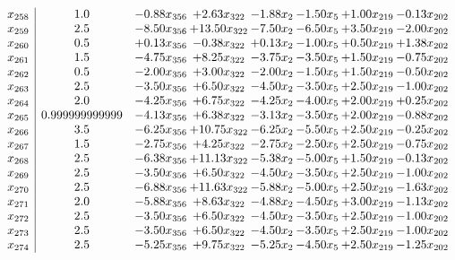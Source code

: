 \documentclass[8pt]{article}
\begin{document}
\[\begin{array}{c| c c@{\hskip 2pt} c@{\hskip 2pt} c@{\hskip 2pt} c@{\hskip 2pt} c@{\hskip 2pt} c@{\hskip 2pt} }
 x_{258}   &  1.0 & -0.88 x_{356} & +  2.63 x_{322} & -1.88 x_{2} & -1.50 x_{5} & +  1.00 x_{219} & -0.13 x_{202}\\
 x_{259}   &  2.5 & -8.50 x_{356} & + 13.50 x_{322} & -7.50 x_{2} & -6.50 x_{5} & +  3.50 x_{219} & -2.00 x_{202}\\
 x_{260}   &  0.5 & +  0.13 x_{356} & -0.38 x_{322} & +  0.13 x_{2} & -1.00 x_{5} & +  0.50 x_{219} & +  1.38 x_{202}\\
 x_{261}   &  1.5 & -4.75 x_{356} & +  8.25 x_{322} & -3.75 x_{2} & -3.50 x_{5} & +  1.50 x_{219} & -0.75 x_{202}\\
 x_{262}   &  0.5 & -2.00 x_{356} & +  3.00 x_{322} & -2.00 x_{2} & -1.50 x_{5} & +  1.50 x_{219} & -0.50 x_{202}\\
 x_{263}   &  2.5 & -3.50 x_{356} & +  6.50 x_{322} & -4.50 x_{2} & -3.50 x_{5} & +  2.50 x_{219} & -1.00 x_{202}\\
 x_{264}   &  2.0 & -4.25 x_{356} & +  6.75 x_{322} & -4.25 x_{2} & -4.00 x_{5} & +  2.00 x_{219} & +  0.25 x_{202}\\
 x_{265}   &  0.999999999999 & -4.13 x_{356} & +  6.38 x_{322} & -3.13 x_{2} & -3.50 x_{5} & +  2.00 x_{219} & -0.88 x_{202}\\
 x_{266}   &  3.5 & -6.25 x_{356} & + 10.75 x_{322} & -6.25 x_{2} & -5.50 x_{5} & +  2.50 x_{219} & -0.25 x_{202}\\
 x_{267}   &  1.5 & -2.75 x_{356} & +  4.25 x_{322} & -2.75 x_{2} & -2.50 x_{5} & +  2.50 x_{219} & -0.75 x_{202}\\
 x_{268}   &  2.5 & -6.38 x_{356} & + 11.13 x_{322} & -5.38 x_{2} & -5.00 x_{5} & +  1.50 x_{219} & -0.13 x_{202}\\
 x_{269}   &  2.5 & -3.50 x_{356} & +  6.50 x_{322} & -4.50 x_{2} & -3.50 x_{5} & +  2.50 x_{219} & -1.00 x_{202}\\
 x_{270}   &  2.5 & -6.88 x_{356} & + 11.63 x_{322} & -5.88 x_{2} & -5.00 x_{5} & +  2.50 x_{219} & -1.63 x_{202}\\
 x_{271}   &  2.0 & -5.88 x_{356} & +  8.63 x_{322} & -4.88 x_{2} & -4.50 x_{5} & +  3.00 x_{219} & -1.13 x_{202}\\
 x_{272}   &  2.5 & -3.50 x_{356} & +  6.50 x_{322} & -4.50 x_{2} & -3.50 x_{5} & +  2.50 x_{219} & -1.00 x_{202}\\
 x_{273}   &  2.5 & -3.50 x_{356} & +  6.50 x_{322} & -4.50 x_{2} & -3.50 x_{5} & +  2.50 x_{219} & -1.00 x_{202}\\
 x_{274}   &  2.5 & -5.25 x_{356} & +  9.75 x_{322} & -5.25 x_{2} & -4.50 x_{5} & +  2.50 x_{219} & -1.25 x_{202}\\

\end{array}\]
\end{document}

